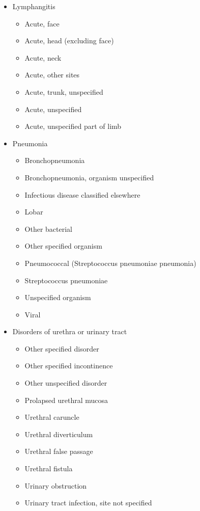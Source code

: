 \begin{itemize}
    \item{Lymphangitis}
    \begin{itemize}
        \item Acute, face
        \item Acute, head (excluding face)
        \item Acute, neck
        \item Acute, other sites
        \item Acute, trunk, unspecified
        \item Acute, unspecified
        \item Acute, unspecified part of limb
    \end{itemize}
    
    \item Pneumonia
    \begin{itemize}
        \item Bronchopneumonia
        \item Bronchopneumonia, organism unspecified
        \item Infectious disease classified elsewhere
        \item Lobar
        \item Other bacterial
        \item Other specified organism
        \item Pneumococcal (Streptococcus pneumoniae pneumonia)
        \item Streptococcus pneumoniae
        \item Unspecified organism
        \item Viral
    \end{itemize}
    
    \item Disorders of urethra or urinary tract
    \begin{itemize}
        \item Other specified disorder
        \item Other specified incontinence
        \item Other unspecified disorder
        \item Prolapsed urethral mucosa
        \item Urethral caruncle
        \item Urethral diverticulum
        \item Urethral false passage
        \item Urethral fistula
        \item Urinary obstruction
        \item Urinary tract infection, site not specified
    \end{itemize}
\end{itemize}

